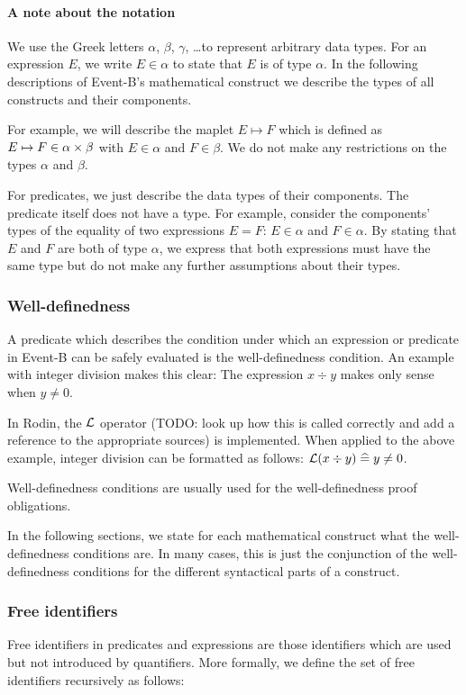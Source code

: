 \paragraph{A note about the notation}
We use the Greek letters $\alpha$, $\beta$, $\gamma$, \ldots to represent arbitrary data types.
For an expression $E$, we write $E\in\alpha$ to state that $E$ is of type $\alpha$.
In the following descriptions of Event-B's mathematical construct we describe the
  types of all constructs and their components.

For example, we will describe the maplet $E\mapsto F$ which is defined as $E\mapsto F\in\alpha\mathbin\times\beta$ with
 $E\in\alpha$ and $F\in\beta$. We do not make any restrictions on the types $\alpha$ and $\beta$.

For predicates, we just describe the data types of their components. 
The predicate itself does not have a type.
For example, consider the components' types of the equality of two expressions $E=F$: $E\in\alpha$ and $F\in\alpha$.
By stating that $E$ and $F$ are both of type $\alpha$, we express that both expressions must have the
  same type but do not make any further assumptions about their types.

\subsubsection{Well-definedness}

A predicate which describes the condition under which an expression or predicate in Event-B can be safely evaluated is the well-definedness condition.
An example with integer division makes this clear: The expression $x\div y$ makes only sense when $y\neq 0$.

In Rodin, the $\mathcal{L}$ operator (TODO: look up how this is called correctly and add a reference to the appropriate
sources) is implemented. When applied to the above example, integer division can be formatted as follows: $\mathcal{L}(x\div y) \mathrel{\widehat=} y\neq 0$.

Well-definedness conditions are usually used for the well-definedness proof obligations.

In the following sections, we state for each mathematical construct what the well-definedness conditions are.
In many cases, this is just the conjunction of the well-definedness conditions for the different syntactical parts of a construct.

\subsubsection{Free identifiers}
\label{free_identifiers}
Free identifiers in predicates and expressions are those identifiers which are used but not introduced by quantifiers.
More formally, we define the set of free identifiers \freeids recursively as follows:

